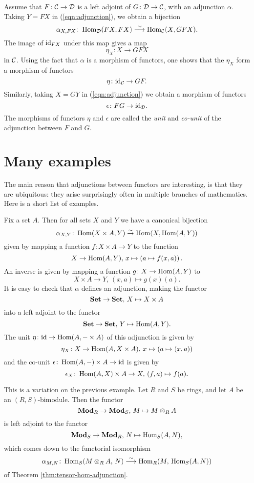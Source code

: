 Assume that $F\colon {\mathcal{C}} \to {\mathcal{D}}$ is a left adjoint of $G\colon {\mathcal{D}} \to {\mathcal{C}}$, with an adjunction $\alpha$. 
Taking $Y=FX$ in (\ref{eqn:adjunction}), we obtain a bijection 
\[
	\alpha_{X,FX}\colon \operatorname{Hom}_{\mathcal{D}}(FX,FX) \overset{\sim}{\longrightarrow} \operatorname{Hom}_{\mathcal{C}}(X,GFX).
\]
The image of ${\rm id}_{FX}$ under this map gives a map
\[
	\eta_X \colon X \to GFX
\]
in ${\mathcal{C}}$. Using the fact that $\alpha$ is a morphism of functors, one shows that the $\eta_X$ form a morphism of functors
\[
	\eta\colon {\rm id}_{\mathcal{C}} \to GF.
\]
Similarly, taking $X=GY$ in (\ref{eqn:adjunction}) we obtain a morphism of functors
\[
	\epsilon\colon FG \to {\rm id}_{\mathcal{D}}.
\]
The morphisms of functors $\eta$ and $\epsilon$ are called the \emph{unit} and \emph{co-unit} of the adjunction between $F$ and $G$.


\section{Many examples}


The main reason that adjunctions between functors are interesting, is that they are ubiquitous: they arise surprisingly often in multiple branches of mathematics. Here is a short list of examples.

\begin{example}
Fix a set $A$. Then for all sets $X$ and $Y$ we have a canonical bijection
\[
	\alpha_{X,Y}\colon \operatorname{Hom}(X\times A, Y ) \overset{\sim}{\to} \operatorname{Hom}(X, \operatorname{Hom}(A,Y))
\]
given  by mapping a function $f\colon X\times A \to Y$ to the function
\[
	X \to \operatorname{Hom}(A,Y),\, x \mapsto \left( a \mapsto f(x,a) \right).
\]
An inverse is given by mapping a function $g\colon X\to \operatorname{Hom}(A,Y)$ to
\[
	X\times A\to Y,\, (x,a) \mapsto g(x)(a).
\]
It is easy to check that $\alpha$ defines an adjunction, making the functor
\[
	\mathbf{Set} \to \mathbf{Set},\,X \mapsto X \times A
\]
into a left adjoint to the functor
\[
	\mathbf{Set} \to \mathbf{Set},\, Y \mapsto \operatorname{Hom}(A,Y).
\]
The unit $\eta\colon {\rm id} \to \operatorname{Hom}(A,-\times A)$ of this adjunction is given by
\[
	\eta_X \colon X \to \operatorname{Hom}(A,X\times A),\, x \mapsto \left( a \mapsto (x,a) \right)
\]
and the co-unit $\epsilon\colon \operatorname{Hom}(A,-)\times A\to {\rm id}$ is given by
\[
	\epsilon_X \colon \operatorname{Hom}(A,X)\times A \to X,\, (f,a) \mapsto f(a).
\]
\end{example}

\begin{example}
This is a variation on the previous example. Let $R$ and $S$ be rings, and let  $A$ be an $(R,S)$-bimodule. Then the functor
\[
	\mathbf{Mod}_{R} \to \mathbf{Mod}_S,\, M \mapsto  M \otimes_R A
\]
is left adjoint to the functor
\[
	\mathbf{Mod}_S \to \mathbf{Mod}_R,\, N \mapsto \operatorname{Hom}_S(A,N),
\]
which comes down to the functorial isomorphism
\[
	\alpha_{M,N}\colon \operatorname{Hom}_S( M \otimes_R A,\, N ) \overset{\sim}{\longrightarrow} \operatorname{Hom}_R( M,\, \operatorname{Hom}_S(A,N) )
\]
of Theorem \ref{thm:tensor-hom-adjunction}.
\end{example}


